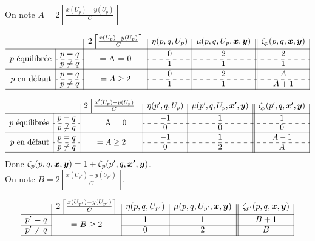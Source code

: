 On note $A = 2 \left\lceil \frac{\displaystyle x(U_p)-y(U_p)}{\displaystyle C} \right\rceil$

\begin{gather*}
  \begin{array}{r|c|c|c|c||c|}
    \multicolumn{2}{c|}{}
    & 2 \left\lceil \frac{x(U_p)-y(U_p)}{C} \right\rceil
    & \eta(p,q,U_p)
    & \mu(p,q,U_p,\bs{x},\bs{y})
    & \zeta_p(p,q,\bs{x},\bs{y})
    \\ \hline
    \multirow{2}{*}{$p$ équilibrée}
    & p=q
    & \multirow{2}{*}{= A = 0}
    & 0
    & 2
    & 2
    \\ \cdashline{2-2}\cdashline{4-6}
    & p \ne q
    &
    & 1
    & 1
    & 1
    \\ \hline
    \multirow{2}{*}{$p$ en défaut}
    & p=q
    & \multirow{2}{*}{$= A \ge 2$}
    & 0
    & 2
    & A
    \\ \cdashline{2-2}\cdashline{4-6}
    & p \ne q
    &
    & 1
    & 1
    & A + 1
    \\ \hline
  \end{array}
\end{gather*}

\begin{gather*}
  \begin{array}{r|c|c|c|c||c|}
    \multicolumn{2}{c|}{}
    & 2 \left\lceil \frac{x'(U_p)-y(U_p)}{C} \right\rceil
    & \eta(p',q,U_p)
    & \mu(p',q,U_p,\bs{x'},\bs{y})
    & \zeta_p(p',q,\bs{x'},\bs{y})
    \\ \hline
    \multirow{2}{*}{$p$ équilibrée}
    & p=q
    & \multirow{2}{*}{= A = 0}
    & -1
    & 1
    & 1
    \\ \cdashline{2-2}\cdashline{4-6}
    & p \ne q
    &
    & 0
    & 0
    & 0
    \\ \hline
    \multirow{2}{*}{$p$ en défaut}
    & p=q
    & \multirow{2}{*}{$= A \ge 2$}
    & -1
    & 1
    & A-1
    \\ \cdashline{2-2}\cdashline{4-6}
    & p \ne q
    &
    & 0
    & 2
    & A
    \\ \hline
  \end{array}
\end{gather*}
Donc $\zeta_p(p,q,\boldsymbol{x},\boldsymbol{y}) = 1 + \zeta_p(p',q,\boldsymbol{x'},\boldsymbol{y})$.
\\

On note $B = 2 \left\lceil \frac{\displaystyle x(U_{p'})-y(U_{p'})}{\displaystyle C} \right\rceil$.

\begin{gather*}
  \begin{array}{r|c|c|c||c|}
    & 2 \left\lceil \frac{x(U_{p'})-y(U_{p'})}{C} \right\rceil
    & \eta(p,q,U_{p'})
    & \mu(p,q,U_{p'},\bs{x},\bs{y})
    & \zeta_{p'}(p,q,\bs{x},\bs{y})
    \\ \hline
    p' = q
    & \multirow{2}{*}{$= B \ge 2$}
    & 1
    & 1
    & B + 1
    \\ \cline{1-1}\cline{3-5}
    p' \ne q
    &
    & 0
    & 2
    & B
    \\ \hline
  \end{array}
\end{gather*}

